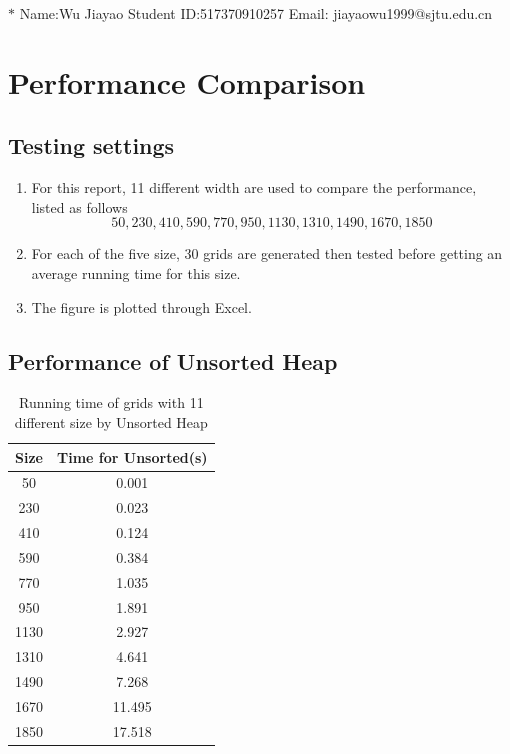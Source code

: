 \documentclass[12pt,a4paper]{article}
\theoremstyle{definition}
\begin{document}
\noindent

\noindent{}
\begin{center}
\footnotesize{\color{blue}$*$ Name:Wu Jiayao  \quad Student ID:517370910257 \quad Email: jiayaowu1999@sjtu.edu.cn}
\end{center}
\section{Performance Comparison}
\subsection{Testing settings}
\begin{enumerate}
    \item For this report, 11 different width are used to compare the performance, listed as follows
    $$
    50,230,410,590,770,950,1130,1310,1490,1670,1850
    $$ 
    \item For each of the five size, 30 grids are generated then tested before getting an average running time for this size.
    \item The figure is plotted through Excel.
\end{enumerate}
\subsection{Performance of Unsorted Heap}
\begin{table}[h]
    \centering
    \begin{tabular}{|c|c|}
    \hline
    Size & Time for Unsorted(s) \\ \hline
    50   & 0.001    \\ \hline
    230  & 0.023    \\ \hline
    410  & 0.124    \\ \hline
    590  & 0.384    \\ \hline
    770  & 1.035    \\ \hline
    950  & 1.891    \\ \hline
    1130 & 2.927    \\ \hline
    1310 & 4.641    \\ \hline
    1490 & 7.268    \\ \hline
    1670 & 11.495   \\ \hline
    1850 & 17.518   \\ \hline
    \end{tabular}
    \caption{Running time of grids with 11 different size by Unsorted Heap}
    \label{unsorted}
\end{table}
\newpage
\end{document}
